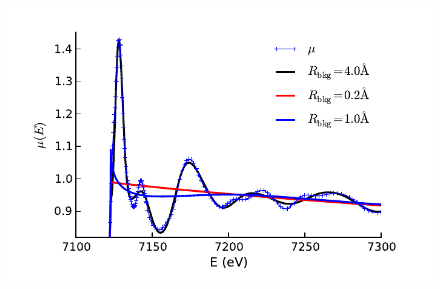 \begin{figure}[tbh]
\begin{center}
        \includegraphics*[width=3.5truein]{../figs/rbkg_mu}\vspace{0.25mm}


\end{center}
\end{figure}
